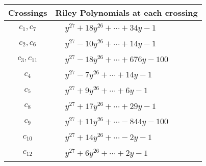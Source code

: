 \documentclass[1p]{elsarticle_modified}
\theoremstyle{definition}
\begin{document}
\begin{tabular}{m{50pt}|m{274pt}}
Crossings & \hspace{64pt}Riley Polynomials at each crossing \\
\hline $$\begin{aligned}c_{1},c_{7}\end{aligned}$$&$\begin{aligned}
&y^{27}+18 y^{26}+\cdots+34 y-1
\end{aligned}$\\
\hline $$\begin{aligned}c_{2},c_{6}\end{aligned}$$&$\begin{aligned}
&y^{27}-10 y^{26}+\cdots+14 y-1
\end{aligned}$\\
\hline $$\begin{aligned}c_{3},c_{11}\end{aligned}$$&$\begin{aligned}
&y^{27}-18 y^{26}+\cdots+676 y-100
\end{aligned}$\\
\hline $$\begin{aligned}c_{4}\end{aligned}$$&$\begin{aligned}
&y^{27}-7 y^{26}+\cdots+14 y-1
\end{aligned}$\\
\hline $$\begin{aligned}c_{5}\end{aligned}$$&$\begin{aligned}
&y^{27}+9 y^{26}+\cdots+6 y-1
\end{aligned}$\\
\hline $$\begin{aligned}c_{8}\end{aligned}$$&$\begin{aligned}
&y^{27}+17 y^{26}+\cdots+29 y-1
\end{aligned}$\\
\hline $$\begin{aligned}c_{9}\end{aligned}$$&$\begin{aligned}
&y^{27}+11 y^{26}+\cdots-844 y-100
\end{aligned}$\\
\hline $$\begin{aligned}c_{10}\end{aligned}$$&$\begin{aligned}
&y^{27}+14 y^{26}+\cdots-2 y-1
\end{aligned}$\\
\hline $$\begin{aligned}c_{12}\end{aligned}$$&$\begin{aligned}
&y^{27}+6 y^{26}+\cdots+2 y-1
\end{aligned}$\\
\hline
\end{tabular}\\~\\
\end{document}

